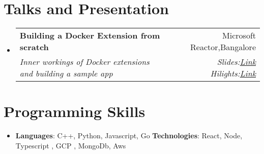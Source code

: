 \documentclass[letterpaper,11pt]{article}
\makeatletter
\newcommand{\resumeSubheading}[4]{
  \vspace{-1pt}\item
    \begin{tabular*}{0.97\textwidth}{l@{\extracolsep{\fill}}r}
      \textbf{#1} & #2 \\
      \textit{\small#3} & \textit{\small #4} \\
    \end{tabular*}\vspace{-5pt}
}
\newcommand{\resumeSubHeadingListStart}{\begin{itemize}[leftmargin=*]}
\newcommand{\resumeSubHeadingListEnd}{\end{itemize}}
\makeatother
\begin{document}
%


  \section{Talks and Presentation}
  \resumeSubHeadingListStart
    \resumeSubheading
      {Building a Docker Extension from scratch }{ Microsoft Reactor,Bangalore}
      {Inner workings of Docker extensions and building a sample app}{Slides:\href{https://docs.google.com/presentation/d/1eOYVtNRt8SeyemGuL_uZIlJyrxOAl_gprnx9v2aZAUM/edit?usp=sharing}{Link}   Hilights:\href{https://drive.google.com/drive/folders/1Cc1-D9oDcjYr8iZqH8Dr1RG95xvYg9NM?usp=sharing}{Link}}
  \resumeSubHeadingListEnd

\section{Programming Skills}
 \resumeSubHeadingListStart
   \item{
     \textbf{Languages}{: C++, Python, Javascript, Go }
     \hfill
     \textbf{Technologies}{: React, Node, Typescript , GCP , MongoDb, Aws}
   }
 \resumeSubHeadingListEnd


\end{document}

